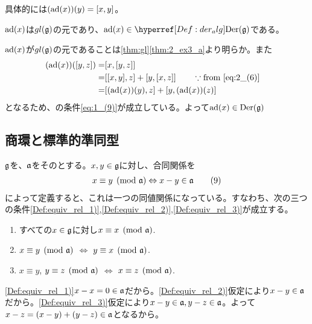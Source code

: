 \documentclass[fleqn,twocolumn,titlepage,dvipdfmx]{jsarticle}
\begin{document}
\begin{remark}
  具体的には$\qty(\ad(x))(y)=\comm{x}{y}$。
\end{remark}

\begin{theorem}
  \href{Def:adj_rep}{$\operatorname{ad}(x)$}は\href{thm:2_ex3_b}{$gl(\mathfrak{g})$}の元であり、$\ad(x)\in\href{Def:der_alg}{\Der(\g)}$である。
\end{theorem}

\begin{Proof}
  $\operatorname{ad}(x)$が$gl(\mathfrak{g})$の元であることは\cref{thm:gl}\ref{thm:2_ex3_a}より明らか。また
  \begin{align*}
    (\ad(x))\qty(\comm{y}{z}) =& \comm{x}{\comm{y}{z}}\\
    =& \comm{\comm{x}{y}}{z}+\comm{y}{\comm{x}{z}} \qq{} \because \qq*{from \eqref{eq:2_(6)}}\\
    =& \comm{\qty(\ad(x))(y)}{z}+\comm{y}{\qty(\ad(x))(z)}
  \end{align*}
  となるため、{}の条件\eqref{eq:1_(9)}が成立している。よって$\operatorname{ad}(x)\in\operatorname{Der}(\mathfrak{g})$
\end{Proof}

\subsection{商環と標準的準同型}
\begin{theorem}[同値関係]\label{thm:equiv_rel}
  $\mathfrak{g}$を{}、$\mathfrak{a}$をその{}とする。$x,y\in\mathfrak{g}$に対し、合同関係を
  \begin{align*}
    x\equiv y \pmod{\mathfrak{a}} \Leftrightarrow x-y\in\mathfrak{a}
    \tag{9}\label{eq:2_(9)}
  \end{align*}
  によって定義すると、これは一つの同値関係になっている。すなわち、次の三つの条件\ref{Def:equiv_rel_1)},\ref{Def:equiv_rel_2)},\ref{Def:equiv_rel_3)}が成立する。
  \begin{enumerate}[label=\arabic*)]
    \item \label{Def:equiv_rel_1)} すべての$x\in\mathfrak{g}$に対し$x\equiv x \pmod{\mathfrak{a}}$.
    \item \label{Def:equiv_rel_2)}$x\equiv y \pmod{\mathfrak{a}}$ $\Leftrightarrow$ $y\equiv x \pmod{\mathfrak{a}}$.
    \item \label{Def:equiv_rel_3)}$x\equiv y$, $y\equiv z\pmod{\mathfrak{a}}$ $\Leftrightarrow$ $x\equiv z \pmod{\mathfrak{a}}$.
  \end{enumerate}
\end{theorem}

\begin{Proof}
  \ref{Def:equiv_rel_1)}$x-x=0\in\mathfrak{a}$だから。\ref{Def:equiv_rel_2)}仮定により$x-y\in\mathfrak{a}$だから。\ref{Def:equiv_rel_3)}仮定により$x-y\in\mathfrak{a},y-z\in\mathfrak{a}$。よって$x-z=(x-y)+(y-z)\in\mathfrak{a}$となるから。
\end{Proof}
\end{document}
